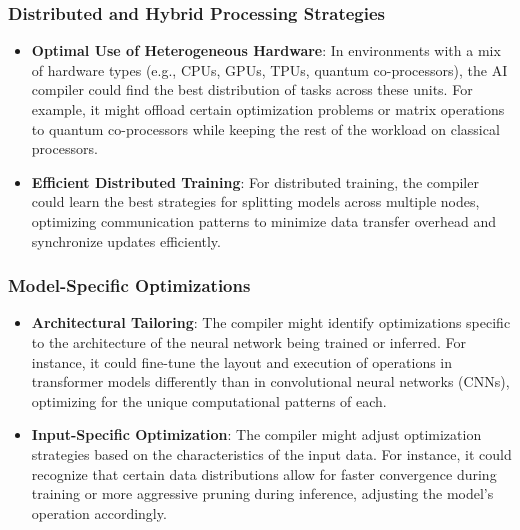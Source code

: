 \documentclass{article}
\begin{document}
\subsubsection{Distributed and Hybrid Processing Strategies}
\begin{itemize}
    \item \textbf{Optimal Use of Heterogeneous Hardware}: In environments with a mix of hardware types (e.g., CPUs, GPUs, TPUs, quantum co-processors), the AI compiler could find the best distribution of tasks across these units. For example, it might offload certain optimization problems or matrix operations to quantum co-processors while keeping the rest of the workload on classical processors.
    \item \textbf{Efficient Distributed Training}: For distributed training, the compiler could learn the best strategies for splitting models across multiple nodes, optimizing communication patterns to minimize data transfer overhead and synchronize updates efficiently.
\end{itemize}

\subsubsection{Model-Specific Optimizations}
\begin{itemize}
    \item \textbf{Architectural Tailoring}: The compiler might identify optimizations specific to the architecture of the neural network being trained or inferred. For instance, it could fine-tune the layout and execution of operations in transformer models differently than in convolutional neural networks (CNNs), optimizing for the unique computational patterns of each.
    \item \textbf{Input-Specific Optimization}: The compiler might adjust optimization strategies based on the characteristics of the input data. For instance, it could recognize that certain data distributions allow for faster convergence during training or more aggressive pruning during inference, adjusting the model’s operation accordingly.
\end{itemize}
\end{document}
